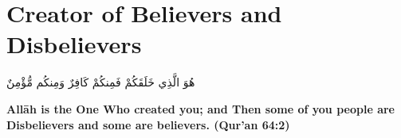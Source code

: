\chapter{Creator of Believers and Disbelievers}
\begin{center}
    {\Huge    
        \begin{Arabic}
            هُوَ الَّذِي خَلَقَكُمْ فَمِنكُمْ كَافِرٌ وَمِنكُم مُّؤْمِنٌ
        \end{Arabic}
    }
\end{center}
\vspace*{\fill}
\vspace{3cm}
\begin{center}
    \large \textbf{Allāh is the One Who created you; and Then some of you people are Disbelievers and some are believers. (Qur'an 64:2)}
\end{center}
